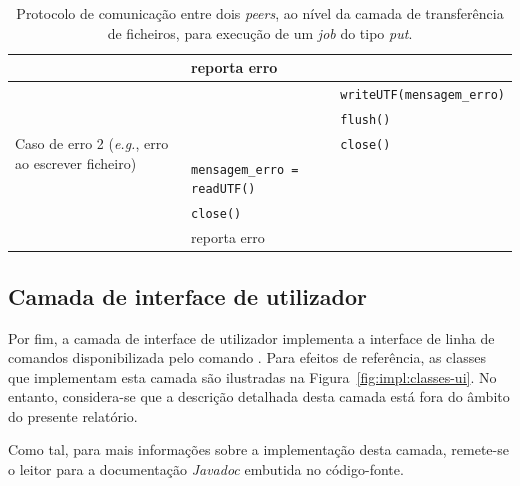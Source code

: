 \begin{table}[p]
\begin{tabularx}{\textwidth}{|p{2cm}|X|X|}
         & reporta erro & \\
        \hline \multirow[t]{5}{=}{Caso de erro 2 (\emph{e.g.}, erro ao escrever ficheiro)}
         & & \verb|writeUTF(mensagem_erro)| \\
         & & \verb|flush()| \\
         & & \verb|close()| \\
         & \verb|mensagem_erro = readUTF()| & \\
         & \verb|close()| & \\
         & reporta erro & \\
        \hline
    \end{tabularx}
    \caption{Protocolo de comunicação entre dois \emph{peers}, ao nível da camada de transferência de ficheiros, para execução de um \emph{job} do tipo \emph{put}.}
    \label{tbl:impl:protocolo-put}
\end{table}


\subsection{Camada de interface de utilizador}

Por fim, a camada de interface de utilizador implementa a interface de linha de comandos disponibilizada pelo comando . Para efeitos de referência, as classes que implementam esta camada são ilustradas na Figura~\ref{fig:impl:classes-ui}. No entanto, considera-se que a descrição detalhada desta camada está fora do âmbito do presente relatório.

Como tal, para mais informações sobre a implementação desta camada, remete-se o leitor para a documentação \emph{Javadoc} embutida no código-fonte.

